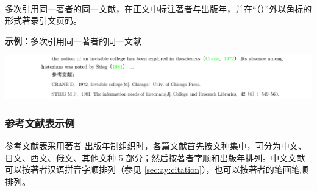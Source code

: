 \documentclass[twoside]{article}%
\begin{document}
%


\paragraph{}\label{sec:ay:multicites} 多次引用同一著者的同一文献，在正文中标注著者与出版年，并在“（）”外以角标的形式著录引文页码。

\textbf{示例：}多次引用同一著者的同一文献

\noindent\hspace{-2.5cm}\includegraphics[width=\paperwidth,page=4]{tngbcitationaynew.pdf}

%
%
%
%
%


\subsubsection{参考文献表示例}

参考文献表采用著者-出版年制组织时，各篇文献首先按文种集中，可分为中文、日文、西文、俄文、其他文种 5 部分；然后按著者字顺和出版年排列。中文文献可以按著者汉语拼音字顺排列（参见 \ref{sec:ay:citation}），也可以按著者的笔画笔顺排列。
\end{document}
